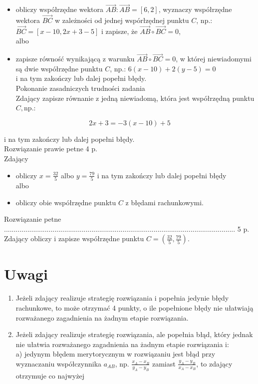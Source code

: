 \documentclass[10pt]{article}
\begin{document}
\begin{itemize}
  \item obliczy współrzędne wektora $\overrightarrow{A B}: \overrightarrow{A B}=[6,2]$, wyznaczy współrzędne wektora $\overrightarrow{B C}$ w zależności od jednej wspórłzędnej punktu $C$, np.: $\overrightarrow{B C}=[x-10,2 x+3-5]$ i zapisze, że $\overrightarrow{A B} \circ \overrightarrow{B C}=0$,\\
albo
  \item zapisze równość wynikającą z warunku $\overrightarrow{A B} \circ \overrightarrow{B C}=0$, w której niewiadomymi są dwie współrzędne punktu $C$, np.: $6(x-10)+2(y-5)=0$\\
i na tym zakończy lub dalej popełni błędy.\\
Pokonanie zasadniczych trudności zadania\\
Zdający zapisze równanie z jedną niewiadomą, która jest współrzędną punktu $C, \mathrm{np}$.:
\end{itemize}

$$
2 x+3=-3(x-10)+5
$$

i na tym zakończy lub dalej popełni błędy.\\
Rozwiązanie prawie petne 4 p.\\
Zdający

\begin{itemize}
  \item obliczy $x=\frac{32}{5}$ albo $y=\frac{79}{5}$ i na tym zakończy lub dalej popełni błędy\\
albo
  \item obliczy obie współrzędne punktu $C$ z błędami rachunkowymi.
\end{itemize}

Rozwiązanie petne ....................................................................................................................... 5 p.\\
Zdający obliczy i zapisze współrzędne punktu $C=\left(\frac{32}{5}, \frac{79}{5}\right)$.

\section*{Uwagi}
\begin{enumerate}
  \item Jeżeli zdający realizuje strategię rozwiązania i popełnia jedynie błędy rachunkowe, to może otrzymać 4 punkty, o ile popełnione błędy nie ułatwiają rozważanego zagadnienia na żadnym etapie rozwiązania.
  \item Jeżeli zdający realizuje strategię rozwiązania, ale popełnia błąd, który jednak nie ułatwia rozważanego zagadnienia na żadnym etapie rozwiązania i:\\
a) jedynym błędem merytorycznym w rozwiązaniu jest błąd przy wyznaczaniu współczynnika $a_{A B}$, np. $\frac{x_{A}-x_{B}}{y_{A}-y_{B}}$ zamiast $\frac{y_{A}-y_{B}}{x_{A}-x_{B}}$, to zdający otrzymuje co najwyżej
\end{enumerate}
\end{document}
